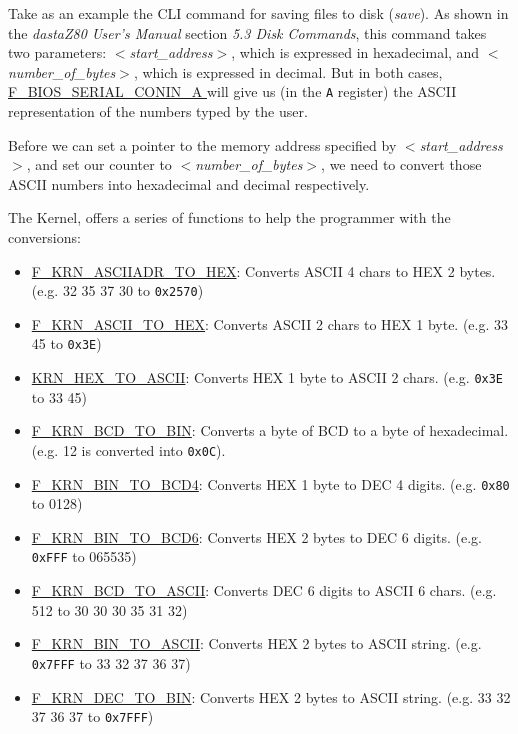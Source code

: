 \documentclass[a4paper,11pt]{article}
\begin{document}
    Take as an example the CLI command for saving files to disk (\textit{save}).
    As shown in the \textit{dastaZ80 User's Manual} section \textit{5.3 Disk
    Commands}, this command takes two parameters: \textit{$<$start\_address$>$},
    which is expressed in hexadecimal, and \textit{$<$number\_of\_bytes$>$}, which
    is expressed in decimal. But in both cases,
    \hyperref[func:fbiosserialconina]{F\_BIOS\_SERIAL\_CONIN\_A } will give
    us (in the \texttt{A} register) the ASCII representation of the numbers typed
    by the user.

    Before we can set a pointer to the memory address specified by 
    \textit{$<$start\_address$>$}, and set our counter to 
    \textit{$<$number\_of\_bytes$>$}, we need to convert those ASCII numbers
    into hexadecimal and decimal respectively.

    The Kernel, offers a series of functions to help the programmer with the
    conversions:

    \begin{itemize}
        \item \hyperref[func:fkrnasciiadrtohex]{F\_KRN\_ASCIIADR\_TO\_HEX}:
        Converts ASCII 4 chars to HEX 2 bytes. (e.g. 32 35 37 30 to \texttt{0x2570})
        \item \hyperref[func:fkrnasciitohex]{F\_KRN\_ASCII\_TO\_HEX}: Converts
        ASCII 2 chars to HEX 1 byte. (e.g. 33 45 to \texttt{0x3E})
        \item \hyperref[func:fkrnhextoascii]{KRN\_HEX\_TO\_ASCII}: Converts
        HEX 1 byte to ASCII 2 chars. (e.g. \texttt{0x3E} to 33 45)
        \item \hyperref[func:fkrnbcdtobin]{F\_KRN\_BCD\_TO\_BIN}: Converts a
        byte of BCD to a byte of hexadecimal. (e.g. 12 is converted into \texttt{0x0C}).
        \item \hyperref[func:fkrnbintobcd4]{F\_KRN\_BIN\_TO\_BCD4}: Converts HEX
        1 byte to DEC 4 digits. (e.g. \texttt{0x80} to 0128)
        \item \hyperref[func:fkrnbintobcd6]{F\_KRN\_BIN\_TO\_BCD6}: Converts HEX
        2 bytes to DEC 6 digits. (e.g. \texttt{0xFFF} to 065535)
        \item \hyperref[func:fkrnbcdtoascii]{F\_KRN\_BCD\_TO\_ASCII}: Converts
        DEC 6 digits to ASCII 6 chars. (e.g. 512 to 30 30 30 35 31 32)
        \item \hyperref[func:fkrnbintoascii]{F\_KRN\_BIN\_TO\_ASCII}: Converts
        HEX 2 bytes to ASCII string. (e.g. \texttt{0x7FFF} to 33 32 37 36 37)
        \item \hyperref[func:fkrndectobin]{F\_KRN\_DEC\_TO\_BIN}:
        Converts HEX 2 bytes to ASCII string. (e.g. 33 32 37 36 37 to
        \texttt{0x7FFF})
    \end{itemize}
\end{document}
